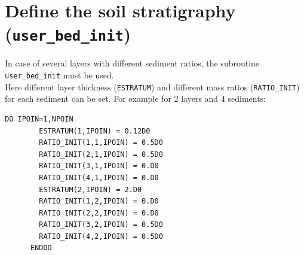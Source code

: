 %


\section{Define the soil stratigraphy (\texttt{user\_bed\_init})}
In case of several layers with different sediment ratios, the subroutine \texttt{user\_bed\_init} must be used. \\
Here different layer thickness (\texttt{ESTRATUM}) and different mass ratios (\texttt{RATIO\_INIT}) for each sediment can be set.
For example for 2 layers and 4 sediments:
\begin{lstlisting}[frame=trBL]
      DO IPOIN=1,NPOIN
        ESTRATUM(1,IPOIN) = 0.12D0
        RATIO_INIT(1,1,IPOIN) = 0.5D0
        RATIO_INIT(2,1,IPOIN) = 0.5D0
        RATIO_INIT(3,1,IPOIN) = 0.D0
        RATIO_INIT(4,1,IPOIN) = 0.D0
        ESTRATUM(2,IPOIN) = 2.D0
        RATIO_INIT(1,2,IPOIN) = 0.D0
        RATIO_INIT(2,2,IPOIN) = 0.D0
        RATIO_INIT(3,2,IPOIN) = 0.5D0
        RATIO_INIT(4,2,IPOIN) = 0.5D0
      ENDDO
\end{lstlisting}

